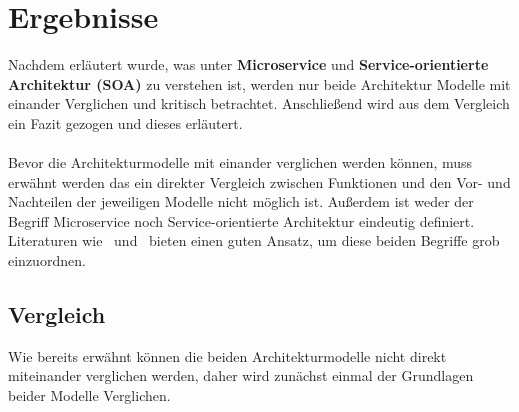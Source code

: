 \chapter{Ergebnisse}
\label{chap:ergebnisse}
Nachdem erläutert wurde, was unter \textbf{Microservice} und \textbf{Service-orientierte Architektur (SOA)} zu verstehen ist, werden nur beide Architektur Modelle mit einander Verglichen und kritisch betrachtet. Anschließend wird aus dem Vergleich ein Fazit gezogen und dieses erläutert.
\\\\
Bevor die Architekturmodelle mit einander verglichen werden können, muss erwähnt werden das ein direkter Vergleich zwischen Funktionen und den Vor- und Nachteilen der jeweiligen Modelle nicht möglich ist. Außerdem ist weder der Begriff Microservice noch Service-orientierte Architektur eindeutig definiert. Literaturen wie \cite{100QA}\ und \cite{EWolff2016:Microservices}\ bieten einen guten Ansatz, um diese beiden Begriffe grob einzuordnen.

\section{Vergleich}
\label{sec:Vergleich}
Wie bereits erwähnt können die beiden Architekturmodelle nicht direkt miteinander verglichen werden, daher wird zunächst einmal der Grundlagen beider Modelle Verglichen.

